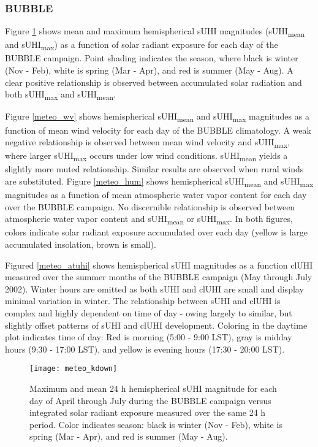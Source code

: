 \begin{bibunit}
\subsubsection{BUBBLE}

Figure \ref{meteo_sol} shows mean and maximum hemispherical sUHI magnitudes (sUHI\textsubscript{mean} and sUHI\textsubscript{max}) as a function of solar radiant exposure for each day of the BUBBLE campaign. Point shading indicates the season, where black is winter (Nov - Feb), white is spring (Mar - Apr), and red is summer (May - Aug). A clear positive relationship is observed between accumulated solar radiation and both sUHI\textsubscript{max} and sUHI\textsubscript{mean}. 

Figure \ref{meteo_wv} shows hemispherical sUHI\textsubscript{mean} and sUHI\textsubscript{max} magnitudes as a function of mean wind velocity for each day of the BUBBLE climatology. A weak negative relationship is observed between mean wind velocity and sUHI\textsubscript{max}, where larger sUHI\textsubscript{max} occurs under low wind conditions. sUHI\textsubscript{mean} yields a slightly more muted relationship. Similar results are observed when rural winds are substituted. Figure \ref{meteo_hum} shows hemispherical sUHI\textsubscript{mean} and sUHI\textsubscript{max} magnitudes as a function of mean atmospheric water vapor content for each day over the BUBBLE campaign. No discernible relationship is observed between atmospheric water vapor content and sUHI\textsubscript{mean} or sUHI\textsubscript{max}.  In both figures, colors indicate solar radiant exposure accumulated over each day (yellow is large accumulated insolation, brown is small).

Figured \ref{meteo_atuhi} shows hemispherical sUHI magnitudes as a function clUHI measured over the summer months of the BUBBLE campaign (May through July 2002). Winter hours are omitted as both sUHI and clUHI are small and display minimal variation in winter. The relationship between sUHI and clUHI is complex and highly dependent on time of day - owing largely to similar, but slightly offset patterns of sUHI and clUHI development. Coloring in the daytime plot indicates time of day: Red is morning (5:00 - 9:00 LST), gray is midday hours (9:30 - 17:00 LST), and yellow is evening hours (17:30 - 20:00 LST).

\pagebreak

\begin{figure}[H]
	\centering
	\texttt{[image: meteo\_kdown]}
	\caption{Maximum and mean 24 \si{\hour} hemispherical sUHI magnitude for each day of April through July during the BUBBLE campaign versus integrated solar radiant exposure measured over the same 24 \si{\hour} period. Color indicates season: black is winter (Nov - Feb), white is spring (Mar - Apr), and red is summer (May - Aug). }
	\label{meteo_sol}
\end{figure}


\end{bibunit}

